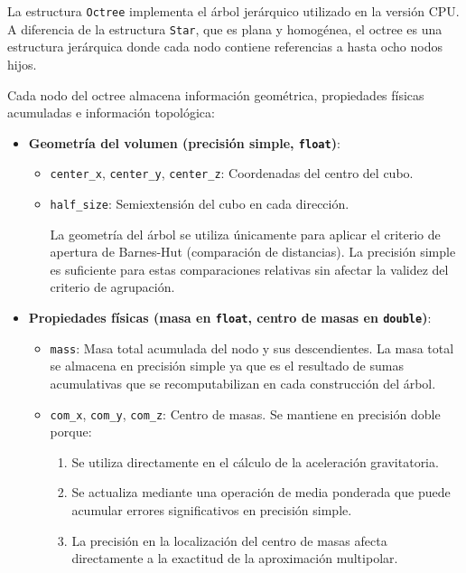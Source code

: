 La estructura \texttt{Octree} implementa el árbol jerárquico utilizado en la versión CPU.
A diferencia de la estructura \texttt{Star}, que es plana y homogénea, el octree es una estructura jerárquica donde cada nodo contiene referencias a hasta ocho nodos hijos.

Cada nodo del octree almacena información geométrica, propiedades físicas acumuladas e información topológica:

\begin{itemize}
    \item \textbf{Geometría del volumen (precisión simple, \texttt{float})}:
    \begin{itemize}
        \item \texttt{center\_x}, \texttt{center\_y}, \texttt{center\_z}: Coordenadas del centro del cubo.

        \item \texttt{half\_size}: Semiextensión del cubo en cada dirección.

        La geometría del árbol se utiliza únicamente para aplicar el criterio de apertura de Barnes-Hut (comparación de distancias).
        La precisión simple es suficiente para estas comparaciones relativas sin afectar la validez del criterio de agrupación.
    \end{itemize}

    \item \textbf{Propiedades físicas (masa en \texttt{float}, centro de masas en \texttt{double})}:
    \begin{itemize}
        \item \texttt{mass}: Masa total acumulada del nodo y sus descendientes.
        La masa total se almacena en precisión simple ya que es el resultado de sumas acumulativas que se recomputabilizan en cada construcción del árbol.

        \item \texttt{com\_x}, \texttt{com\_y}, \texttt{com\_z}: Centro de masas.
        Se mantiene en precisión doble porque:
        \begin{enumerate}
            \item Se utiliza directamente en el cálculo de la aceleración gravitatoria.
            \item Se actualiza mediante una operación de media ponderada que puede acumular errores significativos en precisión simple.
            \item La precisión en la localización del centro de masas afecta directamente a la exactitud de la aproximación multipolar.
        \end{enumerate}
    \end{itemize}


\end{itemize}
